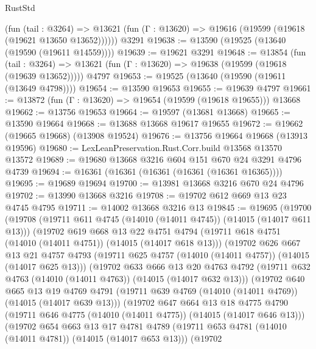 \begin{lexlean}{RustStd}
\begin{coremodule}
      (fun (tail : @3264) =>
      @13621 (fun (Γ : @13620) => @19616 (@19599 (@19618 (@19621 @13650 @13652))))))
    @3291
@19638 := @13590 (@19525 (@13640 (@19590 (@19611 @14559))))
@19639 := @19621 @3291
@19648 := @13854
    (fun (tail : @3264) => @13621 (fun (Γ : @13620) => @19638 (@19599 (@19618 (@19639 @13652)))))
    @4797
@19653 := @19525 (@13640 (@19590 (@19611 (@13649 @4798))))
@19654 := @13590 @19653
@19655 := @19639 @4797
@19661 := @13872 (fun (Γ : @13620) => @19654 (@19599 (@19618 @19655))) @13668
@19662 := @13756 @19653
@19664 := @19597 (@13681 @13668)
@19665 := @13590 @19664
@19668 := @13688 @13668 @19617 @19655
@19672 := @19662 (@19665 @19668) (@13908 @19524)
@19676 := @13756 @19664 @19668 (@13913 @19596)
@19680 := LexLeanPreservation.Rust.Corr.build @13568 @13570 @13572
@19689 := @19680 @13668 @3216 @604 @151 @670 @24 @3291 @4796 @4739
@19694 := @16361 (@16361 (@16361 (@16361 (@16361 @16365))))
@19695 := @19689 @19694
@19700 := @13981 @13668 @3216 @670 @24 @4796
@19702 := @13990 @13668 @3216
@19708 := @19702 @612 @669 @13 @23 @4745 @4795
@19711 := @14002 @13668 @3216 @13
@19845 := @19695
    (@19700
      (@19708
        (@19711 @611 @4745 (@14010 (@14011 @4745)) (@14015 (@14017 @611 @13)))
        (@19702
          @619
          @668
          @13
          @22
          @4751
          @4794
          (@19711 @618 @4751 (@14010 (@14011 @4751)) (@14015 (@14017 @618 @13)))
          (@19702
            @626
            @667
            @13
            @21
            @4757
            @4793
            (@19711 @625 @4757 (@14010 (@14011 @4757)) (@14015 (@14017 @625 @13)))
            (@19702
              @633
              @666
              @13
              @20
              @4763
              @4792
              (@19711 @632 @4763 (@14010 (@14011 @4763)) (@14015 (@14017 @632 @13)))
              (@19702
                @640
                @665
                @13
                @19
                @4769
                @4791
                (@19711 @639 @4769 (@14010 (@14011 @4769)) (@14015 (@14017 @639 @13)))
                (@19702
                  @647
                  @664
                  @13
                  @18
                  @4775
                  @4790
                  (@19711 @646 @4775 (@14010 (@14011 @4775)) (@14015 (@14017 @646 @13)))
                  (@19702
                    @654
                    @663
                    @13
                    @17
                    @4781
                    @4789
                    (@19711 @653 @4781 (@14010 (@14011 @4781)) (@14015 (@14017 @653 @13)))
                    (@19702

\end{coremodule}
\end{lexlean}
